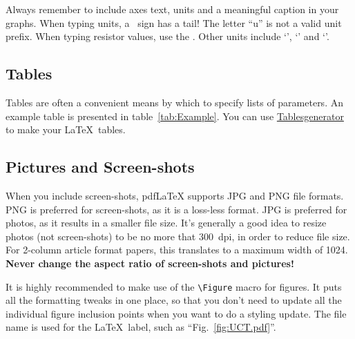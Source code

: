 
Always remember to include axes text, units and a meaningful caption in your graphs.  When typing units, a \micro\ sign has a tail!  The letter ``u'' is not a valid unit prefix.  When typing resistor values, use the \ohm.  Other units include `\degree', `\celsius' and `\perthousand'.

\subsection{Tables}

Tables are often a convenient means by which to specify lists of parameters.  An example table is presented in table~\ref{tab:Example}. You can use \href{https://www.tablesgenerator.com/}{Tablesgenerator} to make your \LaTeX\ tables.


\subsection{Pictures and Screen-shots}

When you include screen-shots, pdf\LaTeX{} supports JPG and PNG file formats.  PNG is preferred for screen-shots, as it is a loss-less format.  JPG is preferred for photos, as it results in a smaller file size.  It's generally a good idea to resize photos (not screen-shots) to be no more that 300~dpi, in order to reduce file size.  For 2-column article format papers, this translates to a maximum width of 1024.  \textbf{Never change the aspect ratio of screen-shots and pictures!}

It is highly recommended to make use of the \verb|\Figure| macro for figures.  It puts all the formatting tweaks in one place, so that you don't need to update all the individual figure inclusion points when you want to do a styling update.  The file name is used for the \LaTeX\ label, such as ``Fig.~\ref{fig:UCT.pdf}''.

